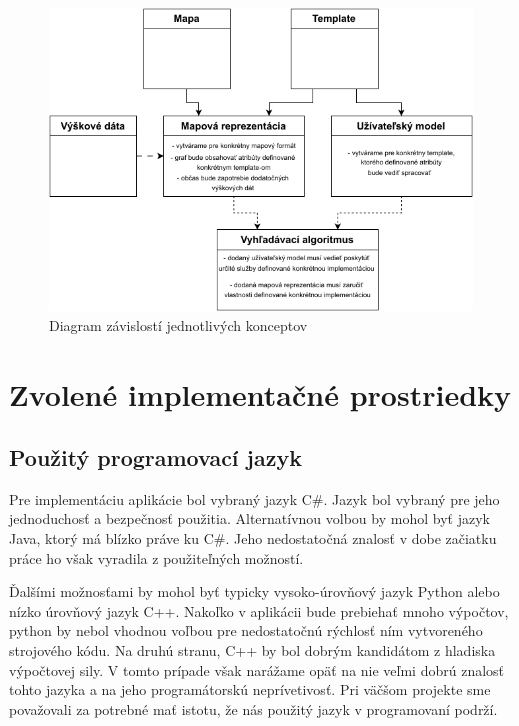 \begin{figure}[h]\centering
\includegraphics[]{img/konceptove_zavislosti}
\caption{Diagram závislostí jednotlivých konceptov} 
\label{obr01:konceptove_zavislosti}
\end{figure}

\pagebreak

\section{Zvolené implementačné prostriedky}

\subsection{Použitý programovací jazyk}

Pre implementáciu aplikácie bol vybraný jazyk C\#. Jazyk bol vybraný pre jeho jednoduchosť a bezpečnosť použitia. Alternatívnou volbou by mohol byť jazyk Java, ktorý má blízko práve ku C\#. Jeho nedostatočná znalosť v dobe začiatku práce ho však vyradila z použiteľných možností. 

Ďalšími možnosťami by mohol byť typicky vysoko-úrovňový jazyk Python alebo nízko úrovňový jazyk C++. Nakoľko v aplikácii bude prebiehať mnoho výpočtov, python by nebol vhodnou voľbou pre nedostatočnú rýchlosť ním vytvoreného strojového kódu. Na druhú stranu, C++ by bol dobrým kandidátom z hladiska výpočtovej sily. V tomto prípade však narážame opäť na nie veľmi dobrú znalosť tohto jazyka a na jeho programátorskú neprívetivosť. Pri väčšom projekte sme považovali za potrebné mať istotu, že nás použitý jazyk v programovaní podrží. 

